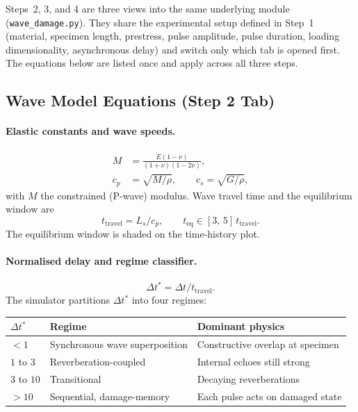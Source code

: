 \documentclass[11pt,a4paper]{article}
\newcommand{\Ls}{L_s}
\begin{document}
Steps~2, 3, and 4 are three views into the same underlying module
(\texttt{wave\_damage.py}). They share the experimental setup defined in
Step~1 (material, specimen length, prestress, pulse amplitude, pulse duration,
loading dimensionality, asynchronous delay) and switch only which tab is
opened first. The equations below are listed once and apply across all three
steps.

\subsection{Wave Model Equations (Step 2 Tab)}

\paragraph{Elastic constants and wave speeds.}
\begin{align}
  M &= \frac{E(1-\nu)}{(1+\nu)(1-2\nu)}, \\
  c_p &= \sqrt{M/\rho}, \qquad c_s = \sqrt{G/\rho},
\end{align}
with $M$ the constrained (P-wave) modulus. Wave travel time and the equilibrium
window are
\begin{equation}
  t_{\text{travel}} = \Ls/c_p, \qquad t_{\text{eq}} \in [3,\,5]\,t_{\text{travel}}.
\end{equation}
The equilibrium window is shaded on the time-history plot.

\paragraph{Normalised delay and regime classifier.}
\begin{equation}
  \Delta t^\ast = \Delta t / t_{\text{travel}}.
\end{equation}
The simulator partitions $\Delta t^\ast$ into four regimes:
\begin{center}
\renewcommand{\arraystretch}{1.25}
\begin{tabular}{@{}lll@{}}
\toprule
$\Delta t^\ast$ & Regime & Dominant physics \\
\midrule
$< 1$ & Synchronous wave superposition & Constructive overlap at specimen \\
$1$ to $3$ & Reverberation-coupled & Internal echoes still strong \\
$3$ to $10$ & Transitional & Decaying reverberations \\
$> 10$ & Sequential, damage-memory & Each pulse acts on damaged state \\
\bottomrule
\end{tabular}
\end{center}
\end{document}
